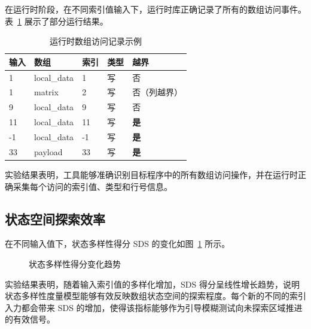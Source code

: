 \documentclass[bachelor]{njupthesis}
\begin{document}
在运行时阶段，在不同索引值输入下，运行时库正确记录了所有的数组访问事件。表~\ref{tab:runtime} 展示了部分运行结果。

\begin{table}[hbt]
\centering
\caption{运行时数组访问记录示例}
\label{tab:runtime}
\begin{tabular}{|l|l|l|l|l|}
\hline
\textbf{输入} & \textbf{数组} & \textbf{索引} & \textbf{类型} & \textbf{越界} \\
\hline
1 & local\_data & 1 & 写 & 否 \\
1 & matrix & 2 & 写 & 否（列越界） \\
9 & local\_data & 9 & 写 & 否 \\
11 & local\_data & 11 & 写 & \textbf{是} \\
-1 & local\_data & -1 & 写 & \textbf{是} \\
33 & payload & 33 & 写 & \textbf{是} \\
\hline
\end{tabular}
\end{table}

实验结果表明，工具能够准确识别目标程序中的所有数组访问操作，并在运行时正确采集每个访问的索引值、类型和行号信息。

\subsection{状态空间探索效率}

在不同输入值下，状态多样性得分 SDS 的变化如图~\ref{fig:diversity} 所示。

\begin{figure}[hbt]
\centering
{}
\caption{状态多样性得分变化趋势}
\label{fig:diversity}
\end{figure}

实验结果表明，随着输入索引值的多样化增加，SDS 得分呈线性增长趋势，说明状态多样性度量模型能够有效反映数组状态空间的探索程度。每个新的不同的索引入力都会带来 SDS 的增加，使得该指标能够作为引导模糊测试向未探索区域推进的有效信号。
\end{document}
